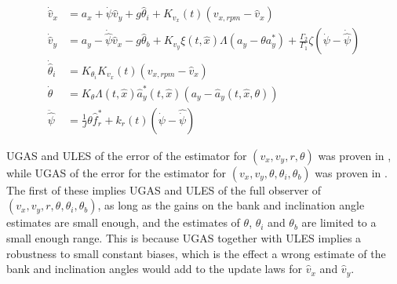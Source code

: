 \begin{align}
    \dot{\hat{v}}_x & = a_x + \dot{\psi}\hat{v}_y + g\hat{\theta}_i + K_{v_x}(t)(v_{x,rpm} - \hat{v}_x) \\
    \dot{\hat{v}}_y & = a_y - \dot{\hat{\psi}}\hat{v}_x - g\hat{\theta}_b + K_{v_y}\xi(t,\hat{x})\Lambda(a_y - \theta a_y^{*}) + \frac{\Gamma_2}{\Gamma_1}\zeta(\dot{\psi} - \dot{\hat{\psi}}) \\ 
    \dot{\hat{\theta}}_i & = K_{\theta_i}K_{v_x}(t)(v_{x,rpm} - \hat{v}_x) \\
    \dot{\theta} & = K_{\theta}\Lambda (t, \hat{x})\hat{a}_y^*(t,\hat{x})(a_y - \hat{a}_y(t,\hat{x},\theta)) \\ 
    \ddot{\hat{\psi}} & = \frac{1}{J}\theta \hat{f}_r^* + k_r(t)(\dot{\psi}-\hat{\dot{\psi}})
\end{align}

\gls{UGAS} and \gls{ULES} of the error of the estimator for $(v_x,v_y,r,\theta)$ was proven in \cite{Automatica08}, while \gls{UGAS} of the error for the estimator for $(v_x,v_y,\theta, \theta_i, \theta_b)$ was proven in \cite{MainStateEst}. The first of these implies \gls{UGAS} and \gls{ULES} of the full observer of $(v_x,v_y, r,\theta, \theta_i, \theta_b)$, as long as the gains on the bank and inclination angle estimates are small enough, and the estimates of $\theta$, $\theta_i$ and $\theta_b$ are limited to a small enough range. This is because \gls{UGAS} together with \gls{ULES} implies a robustness to small constant biases, which is the effect a wrong estimate of the bank and inclination angles would add to the update laws for $\hat{v}_x$ and $\hat{v}_y$. 
